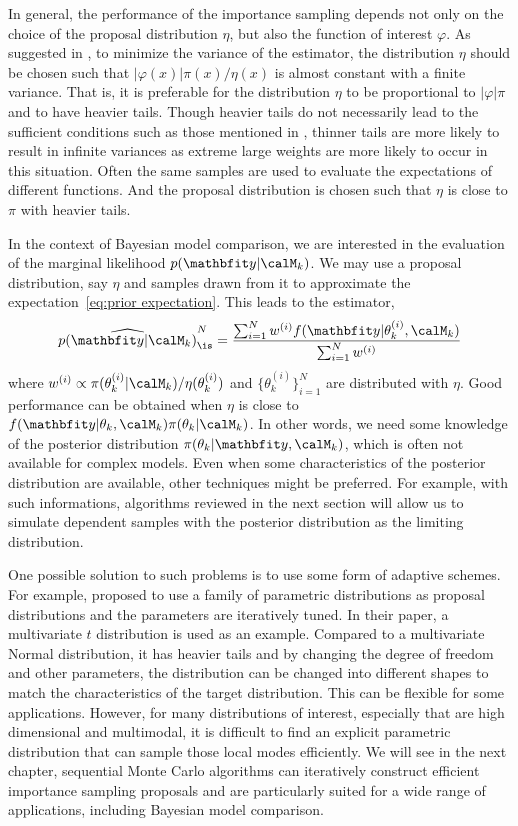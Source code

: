 In general, the performance of the importance sampling depends not only on the
choice of the proposal distribution $\eta$, but also the function of interest
$\varphi$. As suggested in \cite[][sec.~3.3.2]{Robert:2004tn}, to minimize the
variance of the estimator, the distribution $\eta$ should be chosen such that
$|\varphi(x)|\pi(x)/\eta(x)$ is almost constant with a finite variance. That
is, it is preferable for the distribution $\eta$ to be proportional to
$|\varphi|\pi$ and to have heavier tails. Though heavier tails do not
necessarily lead to the sufficient conditions such as those mentioned in
\cite{Geweke:1989tm}, thinner tails are more likely to result in infinite
variances as extreme large weights are more likely to occur in this situation.
Often the same samples are used to evaluate the expectations of different
functions. And the proposal distribution is chosen such that $\eta$ is close
to $\pi$ with heavier tails.

In the context of Bayesian model comparison, we are interested in the
evaluation of the marginal likelihood $p(\data|\calM_k)$. We may use a
proposal distribution, say $\eta$ and samples drawn from it to approximate the
expectation~\eqref{eq:prior expectation}. This leads to the estimator,
\begin{equation}
  \widehat{p(\data|\calM_k)}_{\is}^N =
  \frac{\sum_{i=1}^N w^{(i)} f(\data|\theta_k^{(i)},\calM_k)}
  {\sum_{i=1}^N w^{(i)}}
\end{equation}
where $w^{(i)}\propto\pi(\theta_k^{(i)}|\calM_k)/\eta(\theta_k^{(i)})$ and
$\{\theta_k^{(i)}\}_{i=1}^N$ are distributed with $\eta$. Good performance can
be obtained when $\eta$ is close to
$f(\data|\theta_k,\calM_k)\pi(\theta_k|\calM_k)$. In other words, we need some
knowledge of the posterior distribution $\pi(\theta_k|\data,\calM_k)$, which
is often not available for complex models. Even when some characteristics of
the posterior distribution are available, other techniques might be preferred.
For example, with such informations, algorithms reviewed in the next section
will allow us to simulate dependent samples with the posterior distribution as
the limiting distribution.

One possible solution to such problems is to use some form of adaptive
schemes. For example, \cite{ManSuk:1992vx} proposed to use a family of
parametric distributions as proposal distributions and the parameters are
iteratively tuned. In their paper, a multivariate $t$ distribution is used as
an example. Compared to a multivariate Normal distribution, it has heavier
tails and by changing the degree of freedom and other parameters, the
distribution can be changed into different shapes to match the characteristics
of the target distribution. This can be flexible for some applications.
However, for many distributions of interest, especially that are high
dimensional and multimodal, it is difficult to find an explicit parametric
distribution that can sample those local modes efficiently. We will see in the
next chapter, sequential Monte Carlo algorithms can iteratively construct
efficient importance sampling proposals and are particularly suited for a wide
range of applications, including Bayesian model comparison.


